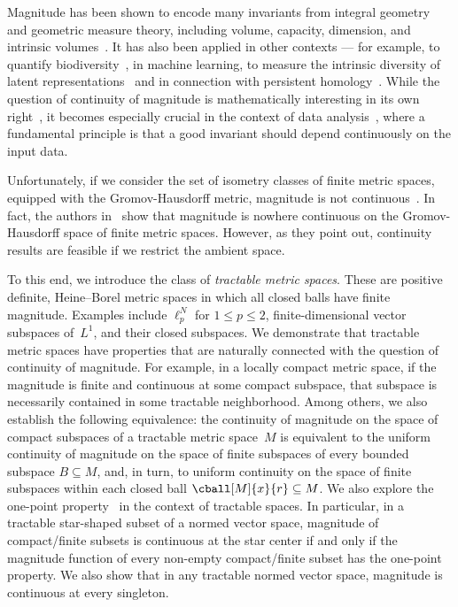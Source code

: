 \documentclass[11pt]{article}
\theoremstyle{plain}
\theoremstyle{definition}
\begin{document}
Magnitude has been shown to encode many invariants from integral geometry and geometric measure theory, including volume, capacity, dimension, and intrinsic volumes~\cite{leinster2010,Meckes2015,Willerton2014,LW13}.  It has also been applied in other contexts --- for example, to quantify biodiversity~\cite{Solow1994,LC12}, in machine learning, to measure the intrinsic diversity of latent representations~\cite{magnitude-ML} and in connection with persistent homology~\cite{O18,OMALLEY2023107396,GH21}. While the question of continuity of magnitude is mathematically interesting in its own right~\cite{LM17,meckes2013,so2025maximumdiversityweightinginvariants,so2026convergencemagnitudefinitepositive}, it becomes especially crucial in the context of data analysis~\cite{katsumasa2025magnitudegenericallycontinuousfinite}, where a fundamental principle is that a good invariant should depend continuously on the input data.


Unfortunately, if we consider the set of isometry classes of finite metric spaces, equipped with the Gromov-Hausdorff metric, magnitude is not continuous~\cite{leinster2010,Roff25}. In fact, the authors in~\cite{katsumasa2025magnitudegenericallycontinuousfinite} show that magnitude is nowhere continuous on the Gromov-Hausdorff space of finite metric spaces. However, as they point out, continuity results are feasible if we restrict the ambient space.

To this end, we introduce the class of \emph{tractable metric spaces}. These are positive definite, Heine--Borel metric spaces in which all closed balls have finite magnitude. Examples include \( \ell_p^N \) for \( 1 \leq p \leq 2 \), finite-dimensional vector subspaces of~\(L^1\), and their closed subspaces. We demonstrate that tractable metric spaces have properties that are naturally connected with the question of continuity of magnitude. For example, in a locally compact metric space, if the magnitude is finite and continuous at some compact subspace, that subspace is necessarily contained in some tractable neighborhood. Among others, we also establish the following equivalence: the continuity of magnitude on the space of compact subspaces of a tractable metric space~$M$ is equivalent to the uniform continuity of magnitude on the space of finite subspaces of every bounded subspace \( B \subseteq M \), and, in turn, to uniform continuity on the space of finite subspaces within each closed ball \( \cball[M]{x}{r} \subseteq M \). We also explore the one-point property~\cite{Roff25,leinster2023spaces} in the context of tractable spaces. In particular, in a tractable star-shaped subset of a normed vector space, magnitude of compact/finite subsets is continuous at the star center if and only if the magnitude function of every non-empty compact/finite subset has the one-point property. We also show that in any tractable normed vector space, magnitude is continuous at every singleton.
\end{document}
